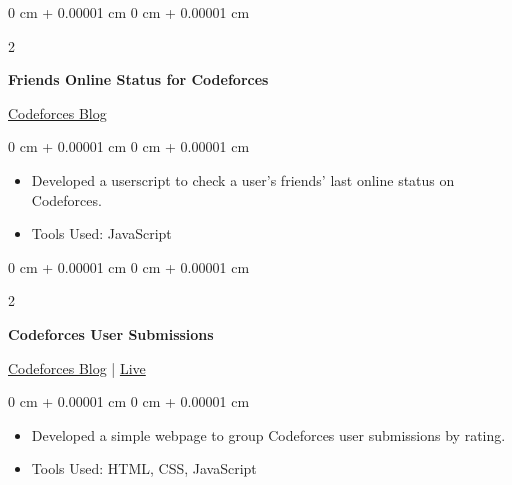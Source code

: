 \documentclass[10pt, letterpaper]{article}
\newenvironment{highlights}{
    \begin{itemize}[
        topsep=0.10 cm,
        parsep=0.10 cm,
        partopsep=0pt,
        itemsep=0pt,
        leftmargin=0 cm + 10pt
    ]
}{
    \end{itemize}
} %
\newenvironment{onecolentry}{
    \begin{adjustwidth}{
        0 cm + 0.00001 cm
    }{
        0 cm + 0.00001 cm
    }
}{
    \end{adjustwidth}
} %
\newenvironment{twocolentry}[2][]{
    \onecolentry
    \def\secondColumn{#2}
    \setcolumnwidth{\fill, 4.5 cm}
    \begin{paracol}{2}
}{
    \switchcolumn \raggedleft \secondColumn
    \end{paracol}
    \endonecolentry
} %
\begin{document}
        \begin{twocolentry}
            {
                \href{https://codeforces.com/blog/entry/110724}{Codeforces Blog}
            }
            \textbf{Friends Online Status for Codeforces}
        \end{twocolentry}

        \vspace{0.10 cm}
        
        \begin{onecolentry}
            \begin{highlights}
                \item Developed a userscript to check a user's friends' last online status on Codeforces.
                \item Tools Used: JavaScript
            \end{highlights}
        \end{onecolentry}

        \vspace{0.2 cm}

        \begin{twocolentry}
            {
                \href{https://codeforces.com/blog/entry/111609}{Codeforces Blog}
                |
                \href{https://cfusersubmissions.vercel.app/}{Live}
            }
            \textbf{Codeforces User Submissions}
        \end{twocolentry}

        \vspace{0.10 cm}
        
        \begin{onecolentry}
            \begin{highlights}
                \item Developed a simple webpage to group Codeforces user submissions by rating.
                \item Tools Used: HTML, CSS, JavaScript
            \end{highlights}
        \end{onecolentry}
\end{document}
